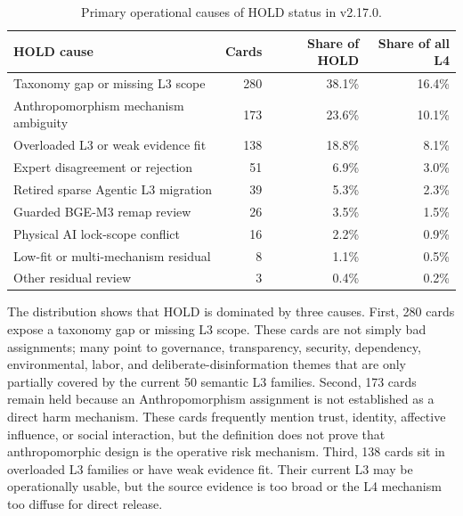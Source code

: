 \documentclass[11pt,a4paper]{article}
\begin{document}
\begin{table}[ht]
\centering
\caption{Primary operational causes of HOLD status in v2.17.0.}
\label{tab:hold-reason-groups-v217}
\begin{tabular}{lrrr}
\toprule
HOLD cause & Cards & Share of HOLD & Share of all L4 \\
\midrule
Taxonomy gap or missing L3 scope & 280 & 38.1\% & 16.4\% \\
Anthropomorphism mechanism ambiguity & 173 & 23.6\% & 10.1\% \\
Overloaded L3 or weak evidence fit & 138 & 18.8\% & 8.1\% \\
Expert disagreement or rejection & 51 & 6.9\% & 3.0\% \\
Retired sparse Agentic L3 migration & 39 & 5.3\% & 2.3\% \\
Guarded BGE-M3 remap review & 26 & 3.5\% & 1.5\% \\
Physical AI lock-scope conflict & 16 & 2.2\% & 0.9\% \\
Low-fit or multi-mechanism residual & 8 & 1.1\% & 0.5\% \\
Other residual review & 3 & 0.4\% & 0.2\% \\
\bottomrule
\end{tabular}
\end{table}

The distribution shows that HOLD is dominated by three causes. First, 280
cards expose a taxonomy gap or missing L3 scope. These cards are not simply
bad assignments; many point to governance, transparency, security,
dependency, environmental, labor, and deliberate-disinformation themes that
are only partially covered by the current 50 semantic L3 families. Second, 173
cards remain held because an Anthropomorphism assignment is not established as
a direct harm mechanism. These cards frequently mention trust, identity,
affective influence, or social interaction, but the definition does not prove
that anthropomorphic design is the operative risk mechanism. Third, 138 cards
sit in overloaded L3 families or have weak evidence fit. Their current L3 may
be operationally usable, but the source evidence is too broad or the L4
mechanism too diffuse for direct release.
\end{document}
